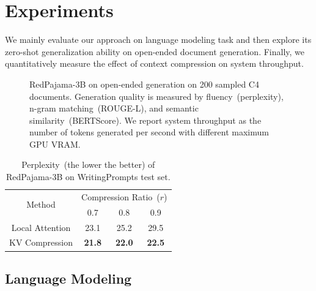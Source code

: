 \section{Experiments}
\label{sec:exp}
We mainly evaluate our approach on language modeling task and then explore its zero-shot generalization ability on open-ended document generation. Finally, we quantitatively measure the effect of context compression on system throughput.
\begin{figure}[t]
	\centering
	\caption{RedPajama-3B on open-ended generation on 200 sampled C4 documents. Generation quality is measured by fluency~(perplexity), n-gram matching~(ROUGE-L), and semantic similarity~(BERTScore). We report system throughput as the number of tokens generated per second with different maximum GPU VRAM.
}
	\label{fig:open_ended}
\end{figure}
\begin{table}[t]
	\small
	\centering
	\begin{tabular}{c|ccc}
	\toprule
	   \multirow{2}{*}{Method} & \multicolumn{3}{c}{Compression Ratio~($r$)}                                                                                                                                                                         \\
								                 & \multicolumn{1}{c}{0.7} & \multicolumn{1}{c}{0.8} & \multicolumn{1}{c}{0.9} \\
	\midrule
	 Local Attention       & 23.1                    & 25.2                    & 29.5                    \\
								  KV Compression      & \textbf{21.8}                    & \textbf{22.0}                    & \textbf{22.5}               \\    
	\bottomrule
	\end{tabular}
	\caption{Perplexity~(the lower the better) of RedPajama-3B  on WritingPrompts test set.
	}
	\label{table:WritingPrompts}
\end{table}
\subsection{Language Modeling}
